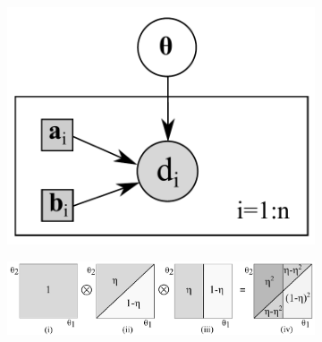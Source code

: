 \begin{figure}%
\begin{subfigure}{.24\textwidth}
\centering
\includegraphics[width=1.0\textwidth]{pic/pref2w.pdf}
\caption{}
\end{subfigure}
\begin{subfigure}{.76\textwidth}
\centering
\includegraphics[width=1.0\textwidth]{pic/running1.pdf}
\caption{}
\label{fig:pref}
\end{subfigure}

\end{figure}
